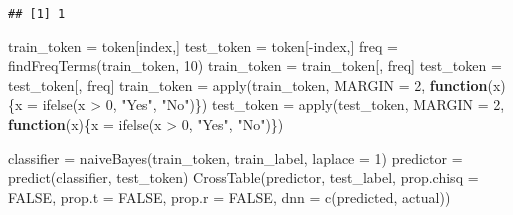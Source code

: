 \documentclass[
]{article}
\newenvironment{Shaded}{\begin{snugshade}}{\end{snugshade}}
\newcommand{\AttributeTok}[1]{\textcolor[rgb]{0.77,0.63,0.00}{#1}}
\newcommand{\ConstantTok}[1]{\textcolor[rgb]{0.00,0.00,0.00}{#1}}
\newcommand{\ControlFlowTok}[1]{\textcolor[rgb]{0.13,0.29,0.53}{\textbf{#1}}}
\newcommand{\DecValTok}[1]{\textcolor[rgb]{0.00,0.00,0.81}{#1}}
\newcommand{\FunctionTok}[1]{\textcolor[rgb]{0.00,0.00,0.00}{#1}}
\newcommand{\NormalTok}[1]{#1}
\newcommand{\OtherTok}[1]{\textcolor[rgb]{0.56,0.35,0.01}{#1}}
\newcommand{\SpecialCharTok}[1]{\textcolor[rgb]{0.00,0.00,0.00}{#1}}
\newcommand{\StringTok}[1]{\textcolor[rgb]{0.31,0.60,0.02}{#1}}
\begin{document}
\begin{verbatim}
## [1] 1
\end{verbatim}

\begin{Shaded}
\begin{Highlighting}[]
\NormalTok{train\_token }\OtherTok{=}\NormalTok{ token[index,]}
\NormalTok{test\_token }\OtherTok{=}\NormalTok{ token[}\SpecialCharTok{{-}}\NormalTok{index,]}
\NormalTok{freq }\OtherTok{=} \FunctionTok{findFreqTerms}\NormalTok{(train\_token, }\DecValTok{10}\NormalTok{)}
\NormalTok{train\_token }\OtherTok{=}\NormalTok{ train\_token[, freq]}
\NormalTok{test\_token }\OtherTok{=}\NormalTok{ test\_token[, freq]}
\NormalTok{train\_token }\OtherTok{=} \FunctionTok{apply}\NormalTok{(train\_token, }\AttributeTok{MARGIN =} \DecValTok{2}\NormalTok{, }\ControlFlowTok{function}\NormalTok{(x)\{x }\OtherTok{=} \FunctionTok{ifelse}\NormalTok{(x }\SpecialCharTok{\textgreater{}} \DecValTok{0}\NormalTok{, }\StringTok{"Yes"}\NormalTok{, }\StringTok{"No"}\NormalTok{)\})}
\NormalTok{test\_token }\OtherTok{=} \FunctionTok{apply}\NormalTok{(test\_token, }\AttributeTok{MARGIN =} \DecValTok{2}\NormalTok{, }\ControlFlowTok{function}\NormalTok{(x)\{x }\OtherTok{=} \FunctionTok{ifelse}\NormalTok{(x }\SpecialCharTok{\textgreater{}} \DecValTok{0}\NormalTok{, }\StringTok{"Yes"}\NormalTok{, }\StringTok{"No"}\NormalTok{)\})}

\NormalTok{classifier }\OtherTok{=} \FunctionTok{naiveBayes}\NormalTok{(train\_token, train\_label, }\AttributeTok{laplace =} \DecValTok{1}\NormalTok{)}
\NormalTok{predictor }\OtherTok{=} \FunctionTok{predict}\NormalTok{(classifier, test\_token)}
\FunctionTok{CrossTable}\NormalTok{(predictor, test\_label, }\AttributeTok{prop.chisq =} \ConstantTok{FALSE}\NormalTok{, }\AttributeTok{prop.t =} \ConstantTok{FALSE}\NormalTok{, }\AttributeTok{prop.r =} \ConstantTok{FALSE}\NormalTok{, }\AttributeTok{dnn =} \FunctionTok{c}\NormalTok{(}\StringTok{\textquotesingle{}predicted\textquotesingle{}}\NormalTok{, }\StringTok{\textquotesingle{}actual\textquotesingle{}}\NormalTok{))}
\end{Highlighting}
\end{Shaded}
\end{document}
